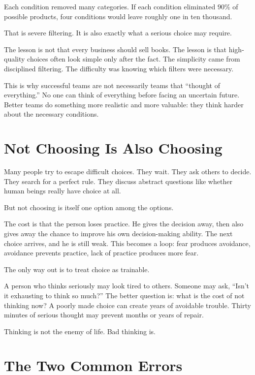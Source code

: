 Each condition removed many categories. If each condition eliminated \(90\%\) of possible products, four conditions would leave roughly one in ten thousand.

That is severe filtering. It is also exactly what a serious choice may require.

The lesson is not that every business should sell books. The lesson is that high-quality choices often look simple only after the fact. The simplicity came from disciplined filtering. The difficulty was knowing which filters were necessary.

This is why successful teams are not necessarily teams that ``thought of everything.'' No one can think of everything before facing an uncertain future. Better teams do something more realistic and more valuable: they think harder about the necessary conditions.

\section*{Not Choosing Is Also Choosing}

Many people try to escape difficult choices. They wait. They ask others to decide. They search for a perfect rule. They discuss abstract questions like whether human beings really have choice at all.

But not choosing is itself one option among the options.

The cost is that the person loses practice. He gives the decision away, then also gives away the chance to improve his own decision-making ability. The next choice arrives, and he is still weak. This becomes a loop: fear produces avoidance, avoidance prevents practice, lack of practice produces more fear.

The only way out is to treat choice as trainable.

A person who thinks seriously may look tired to others. Someone may ask, ``Isn't it exhausting to think so much?'' The better question is: what is the cost of not thinking now? A poorly made choice can create years of avoidable trouble. Thirty minutes of serious thought may prevent months or years of repair.

Thinking is not the enemy of life. Bad thinking is.

\section*{The Two Common Errors}

